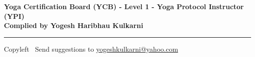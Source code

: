 
\usepackage{polyglossia}
\setdefaultlanguage{sanskrit}

\usepackage{fontspec}
\setmainfont{Segoe UI}
\newfontfamily{}
\newfontfamily{}


\graphicspath{{images/}}


\footnotesize

%

\begin{center}
\Large{\textbf{Yoga Certification Board (YCB) - Level 1 - Yoga Protocol Instructor (YPI)\\ Complied by Yogesh Haribhau Kulkarni}}  
\end{center}

\begin{multicols}{2}

\end{multicols}

\rule{\linewidth}{0.25pt}
\scriptsize
Copyleft \textcopyleft\  Send suggestions to 
\href{http://www.yogeshkulkarni.com}{yogeshkulkarni@yahoo.com}

%


